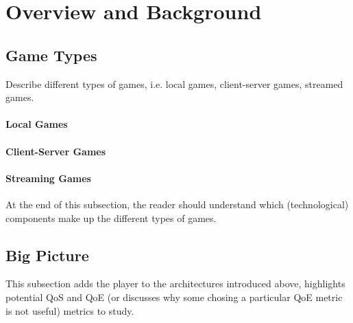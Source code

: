 \section{Overview and Background}\label{sec:big-picture}

\subsection{Game Types}
Describe different types of games, i.e. local games, client-server games, streamed games.


\paragraph*{Local Games}

\paragraph*{Client-Server Games}

\paragraph*{Streaming Games}

At the end of this subsection, the reader should understand which (technological) components make up the different types of games.

\subsection{Big Picture}

This subsection adds the player to the architectures introduced above, highlights potential QoS and QoE (or discusses why some chosing a particular QoE metric is not useful) metrics to study.

